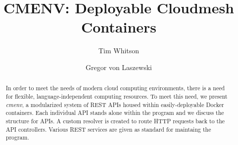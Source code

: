
\def\paperstatus{100} %
\def\paperchapter{REST} %
\def\hid{hid-sp18-526} %
\def\volume{9} %

\def\locator{\hid, Volume: \volume, Chapter: \paperchapter, Status: \paperstatus. \newline}

\title{CMENV: Deployable Cloudmesh Containers}

\author{Tim Whitson}

\author{Gregor von Laszewski}

\renewcommand{\shortauthors}{T. Whitson}

\def\projectname{\textit{cmenv}}

\begin{abstract}
In order to meet the needs of modern cloud computing environments, there is a
need for flexible, language-independent computing resources. To meet this
need, we present \projectname, a modularized system of REST APIs housed
within easily-deployable Docker containers. Each individual API stands alone
within the program and we discuss the structure for APIs. A custom resolver
is created to route HTTP requests back to the API controllers. Various REST
services are given as standard for maintaing the program.
\end{abstract}

